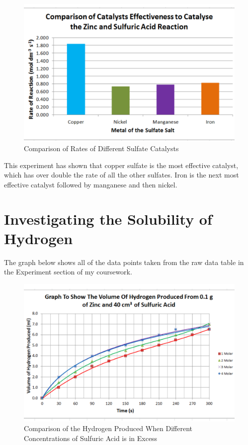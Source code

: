 \begin{figure}[H]
    \includegraphics[width=\textwidth]{./Analysis/Images/4DifferentCatalysts/Comparison.pdf}
    \caption{Comparison of Rates of Different Sulfate Catalysts} \label{fig:ComparisonCat}
\end{figure}

This experiment has shown that copper sulfate is the most effective catalyst, which has over double the rate of all the other sulfates. Iron is the next most effective catalyst followed by manganese and then nickel.


\section{Investigating the Solubility of Hydrogen}

The graph below shows all of the data points taken from the raw data table in the Experiment section of my coursework. 

\begin{figure}[H]
    \includegraphics[width=\textwidth]{./Analysis/Images/Solubility.pdf}
    \caption{Comparison of the Hydrogen Produced When Different Concentrations of Sulfuric Acid is in Excess} \label{fig:ComparisonCat}
\end{figure}

